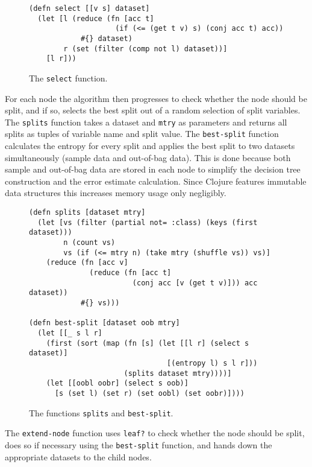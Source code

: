 \documentclass[a4paper,man,12pt,apacite,floatsintext,draftfirst]{apa6} %
\begin{document}
\begin{figure}[H]
\caption{The \texttt{select} function.}
\begin{verbatim}
(defn select [[v s] dataset]
  (let [l (reduce (fn [acc t]
                    (if (<= (get t v) s) (conj acc t) acc))
            #{} dataset)
        r (set (filter (comp not l) dataset))]
    [l r]))
\end{verbatim}
\end{figure}

For each node the algorithm then progresses to check whether the node should be split,
and if so, selects the best split out of a random selection of split variables.
The \texttt{splits} function takes a dataset and \texttt{mtry} as parameters and
returns all splits as tuples of variable name and split value.
The \texttt{best-split} function calculates the entropy for every split and applies
the best split to two datasets simultaneously (sample data and out-of-bag data).
This is done because both sample and out-of-bag data are stored in each node to
simplify the decision tree construction and the error estimate calculation.
Since Clojure features immutable data structures this increases memory usage only negligibly.

\begin{figure}[H]
\caption{The functions \texttt{splits} and \texttt{best-split}.}
\begin{verbatim}
(defn splits [dataset mtry]
  (let [vs (filter (partial not= :class) (keys (first dataset)))
        n (count vs)
        vs (if (<= mtry n) (take mtry (shuffle vs)) vs)]
    (reduce (fn [acc v]
              (reduce (fn [acc t]
                        (conj acc [v (get t v)])) acc dataset))
            #{} vs)))

(defn best-split [dataset oob mtry]
  (let [[_ s l r]
    (first (sort (map (fn [s] (let [[l r] (select s dataset)]
                                [(entropy l) s l r]))
                      (splits dataset mtry))))]
    (let [[oobl oobr] (select s oob)]
      [s (set l) (set r) (set oobl) (set oobr)])))
\end{verbatim}
\end{figure}

The \texttt{extend-node} function uses \texttt{leaf?} to check whether the node
should be split, does so if necessary using the \texttt{best-split} function, and
hands down the appropriate datasets to the child nodes.
\end{document}
